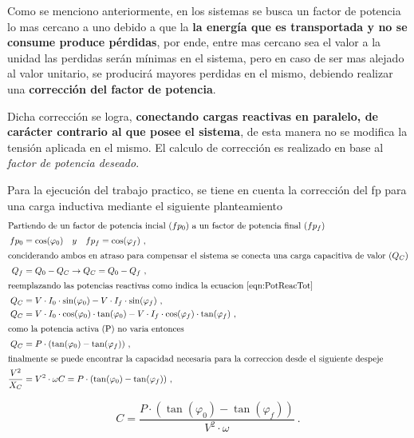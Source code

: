                Como se menciono anteriormente, en los sistemas se busca un factor de potencia 
               lo mas cercano a uno debido a que la \textbf{la energía que es transportada 
               y no se consume produce pérdidas}, por ende, entre mas cercano sea el valor a 
               la unidad las perdidas serán mínimas en el sistema, pero en caso de ser mas alejado 
               al valor unitario, se producirá mayores perdidas en el mismo, debiendo realizar
               una \textbf{corrección del factor de potencia}.

               Dicha corrección se logra, \textbf{conectando cargas reactivas en paralelo, 
               de carácter contrario al que posee el sistema}, de esta manera no se modifica 
               la tensión aplicada en el mismo. El calculo de corrección es realizado en base 
               al \textit{factor de potencia deseado}.
               
               Para la ejecución del trabajo practico, se tiene en cuenta la corrección del 
               fp para una carga inductiva mediante el siguiente planteamiento  
               \begin{align}
                  \intertext{Partiendo de un factor de potencia incial (\(fp_0\)) a un factor
                  de potencia final (\(fp_f\)) }
                  fp_0  &= \cos(\varphi_0) \hspace{10pt} y \hspace{10pt} fp_f = \cos(\varphi_f) \ , \notag \\
                  \intertext{conciderando ambos en atraso para compensar el sistema se 
                  conecta una carga capacitiva de valor (\(Q_C\))}
                  Q_f   &= Q_0 - Q_C \rightarrow Q_C = Q_0 - Q_f  \ , \notag \\
                  \intertext{reemplazando las potencias reactivas como indica la ecuacion~\ref{eqn:PotReacTot}}
                  Q_C   &= V\cdot I_0\cdot \sin(\varphi_0) - V\cdot I_f\cdot \sin(\varphi_f) \ , \notag \\ 
                  Q_C   &= V\cdot I_0\cdot \cos(\varphi_0)\cdot \tan(\varphi_0)  - V\cdot I_f\cdot \cos(\varphi_f)\cdot \tan(\varphi_f) \ , \notag \\
                  \intertext{como la potencia activa (P) no varia entonces}
                  Q_C   &= P\cdot (\tan(\varphi_0) - \tan(\varphi_f)) \ , \notag \\
                  \intertext{finalmente se puede encontrar la capacidad necesaria para la correccion desde el siguiente despeje}
                  \dfrac{V^{2}}{X_C}   &= V^{2}\cdot \omega C = P\cdot (\tan(\varphi_0) - \tan(\varphi_f))  \ , \notag
               \end{align}

                  \begin{equation}
                     \boxed{C = \dfrac{P\cdot (\tan(\varphi_0) - \tan(\varphi_f))}{V^{2}\cdot \omega}}~. \label{eqn:CorrecFp}
                  \end{equation}

      

               
               



							












